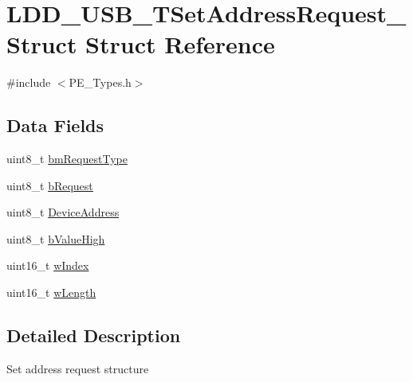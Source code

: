 \hypertarget{struct_l_d_d___u_s_b___t_set_address_request___struct}{\section{L\-D\-D\-\_\-\-U\-S\-B\-\_\-\-T\-Set\-Address\-Request\-\_\-\-Struct Struct Reference}
\label{struct_l_d_d___u_s_b___t_set_address_request___struct}
}


{\ttfamily \#include $<$P\-E\-\_\-\-Types.\-h$>$}

\subsection*{Data Fields}
\begin{DoxyCompactItemize}
\item 
uint8\-\_\-t \hyperlink{struct_l_d_d___u_s_b___t_set_address_request___struct_aff2ef69da69a7765e4751f3d1b10bc36}{bm\-Request\-Type}
\item 
uint8\-\_\-t \hyperlink{struct_l_d_d___u_s_b___t_set_address_request___struct_a0c2e1dccfc6d1a0fa8e0997a1e1db1a1}{b\-Request}
\item 
uint8\-\_\-t \hyperlink{struct_l_d_d___u_s_b___t_set_address_request___struct_ac55059f77c050ba97d5f0d9b2b3a52c9}{Device\-Address}
\item 
uint8\-\_\-t \hyperlink{struct_l_d_d___u_s_b___t_set_address_request___struct_a1a73dd5b67a7394d38d440d99ca2b773}{b\-Value\-High}
\item 
uint16\-\_\-t \hyperlink{struct_l_d_d___u_s_b___t_set_address_request___struct_ab6a26adfbbc2e164679a4d7dcf5c99d0}{w\-Index}
\item 
uint16\-\_\-t \hyperlink{struct_l_d_d___u_s_b___t_set_address_request___struct_adff24e6d3ec27fce1f59693aa215deda}{w\-Length}
\end{DoxyCompactItemize}


\subsection{Detailed Description}
Set address request structure 

